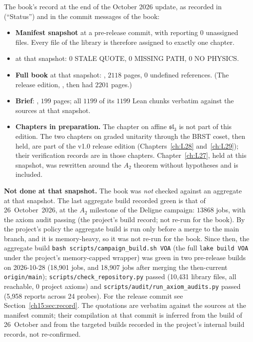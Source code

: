 \begin{status}
The book's record at the end of the October 2026 update, as recorded in
 (``Status'') and in the commit messages of the book:
\begin{itemize}
\item \textbf{Manifest snapshot} at a pre-release commit, with  reporting $0$ unassigned
  files. Every  file of the library is therefore assigned to exactly one chapter.
\item \textbf{} at that snapshot: $0$ STALE QUOTE, $0$ MISSING PATH, $0$ NO PHYSICS.
\item \textbf{Full book} at that snapshot: , $2118$ pages, $0$ undefined references. (The release
  edition, , then had $2201$ pages.)
\item \textbf{Brief}: , $199$ pages; all $1199$ of its $1199$ Lean chunks verbatim against the sources at
  that snapshot.
\item \textbf{Chapters in preparation.} The chapter on affine $\mathfrak{sl}_3$ is not part of this edition. The two
  chapters on graded unitarity through the BRST coset, then held, are part of the v1.0 release edition
  (Chapters~\ref{ch:L28} and~\ref{ch:L29}); their verification records are in those chapters. Chapter~\ref{ch:L27},
  held at this snapshot, was rewritten around the $A_2$ theorem without hypotheses and is included.
\end{itemize}
\textbf{Not done at that snapshot.} The book was \emph{not} checked against an aggregate  at that snapshot. The
last aggregate build recorded green is that of 26~October~2026, at the $A_2$ milestone of the Deligne campaign:
$13868$ jobs, with the axiom audit passing (the project's build record; not re-run for the book). By the project's policy the aggregate build is run
only before a merge to the main branch, and it is memory-heavy, so it was not re-run for the book. Since then, the aggregate build \texttt{bash scripts/campaign\_build.sh VOA} (the full \texttt{lake build VOA} under the project's memory-capped wrapper) was green in two pre-release builds on 2026-10-28 (18{,}901 jobs, and 18{,}907 jobs after merging the then-current \texttt{origin/main}); \texttt{scripts/check\_repository.py} passed (10{,}431 library files, all reachable, 0 project axioms) and \texttt{scripts/audit/run\_axiom\_audits.py} passed (5{,}958 reports across 24 probes). For the release commit see Section~\ref{ch15:sec:record}. The quotations are
verbatim against the sources at the manifest commit; their compilation at that commit is inferred from the build of
26~October and from the targeted builds recorded in the project's internal build records, not re-confirmed.
\end{status}


